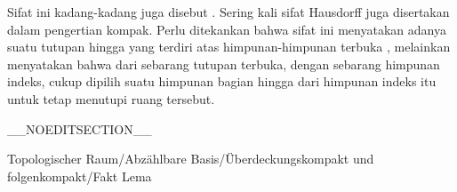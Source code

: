 Sifat ini kadang-kadang juga disebut  {.} Sering kali sifat Hausdorff juga disertakan dalam pengertian kompak. Perlu ditekankan bahwa sifat ini
 menyatakan adanya suatu tutupan hingga yang terdiri atas himpunan-himpunan terbuka
 {} {,}
melainkan menyatakan bahwa dari sebarang tutupan terbuka, dengan sebarang himpunan indeks, cukup dipilih suatu himpunan bagian hingga dari himpunan indeks itu untuk tetap menutupi ruang tersebut.

__NOEDITSECTION__

{Topologischer Raum/Abzählbare Basis/Überdeckungskompakt und folgenkompakt/Fakt}
{Lema}
{}
{

\faktzusatz {}
\faktzusatz {}

}
